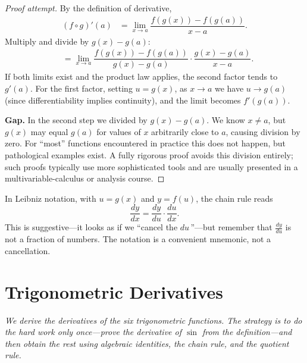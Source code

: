\begin{proof}[Proof attempt]
By the definition of derivative,
\begin{align*}
  (f \circ g)'(a)
  &= \lim_{x \to a} \dfrac{f(g(x)) - f(g(a))}{x - a}.
\end{align*}
Multiply and divide by $g(x) - g(a)$:
\begin{align*}
  &= \lim_{x \to a} \dfrac{f(g(x)) - f(g(a))}{g(x) - g(a)} \cdot \dfrac{g(x) - g(a)}{x - a}.
\end{align*}
If both limits exist and the product law applies, the second factor tends to $g'(a)$.  For the first factor, setting $u = g(x)$, as $x \to a$ we have $u \to g(a)$ (since differentiability implies continuity), and the limit becomes $f'(g(a))$.

\textbf{Gap.}  In the second step we divided by $g(x) - g(a)$.  We know $x \neq a$, but $g(x)$ may equal $g(a)$ for values of $x$ arbitrarily close to $a$, causing division by zero.  For ``most'' functions encountered in practice this does not happen, but pathological examples exist.  A fully rigorous proof avoids this division entirely; such proofs typically use more sophisticated tools and are usually presented in a multivariable-calculus or analysis course.
\end{proof}

\begin{remark}
In Leibniz notation, with $u = g(x)$ and $y = f(u)$, the chain rule reads
\[
  \dfrac{dy}{dx} = \dfrac{dy}{du} \cdot \dfrac{du}{dx}.
\]
This is suggestive---it looks as if we ``cancel the $du$\,''---but remember that $\frac{dy}{du}$ is not a fraction of numbers.  The notation is a convenient mnemonic, not a cancellation.
\end{remark}

\section{Trigonometric Derivatives}
\label{sec:3.12}

\textit{We derive the derivatives of the six trigonometric functions.  The strategy is to do the hard work only once---prove the derivative of $\sin$ from the definition---and then obtain the rest using algebraic identities, the chain rule, and the quotient rule.}

